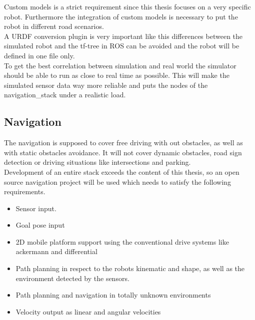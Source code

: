 Custom models is a strict requirement since this thesis focuses on a very specific robot. Furthermore the integration of custom models is necessary to put the robot in different road scenarios.\\

A URDF conversion plugin is very important like this differences between the simulated robot and the tf-tree in ROS can be avoided and the robot will be defined in one file only.\\

To get the best correlation between simulation and real world the simulator should be able to run as close to real time as possible. This will make the simulated sensor data way more reliable and puts the nodes of the navigation\_stack under a realistic load.

\subsection{Navigation}
The navigation is supposed to cover free driving with out obstacles, as well as with static obstacles avoidance. It will not cover dynamic obstacles, road sign detection or driving situations like intersections and parking.\\

Development of an entire stack exceeds the content of this thesis, so an open source navigation project will be used which needs to satisfy the following requirements.
\begin{itemize}
	\item Sensor input.
	\item Goal pose input
	\item 2D mobile platform support using the conventional drive systems like ackermann and differential
	\item Path planning in respect to the robots kinematic and shape, as well as the environment detected by the sensors.
	\item Path planning and navigation in totally unknown environments
	\item Velocity output as linear and angular velocities
\end{itemize}
